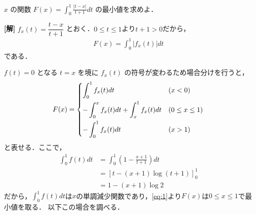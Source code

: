 \documentclass[a4paper,10pt]{ltjsarticle}
\begin{document}
\begin{oframed}
$x$ の関数 $\displaystyle F(x) = \int_0^1 \frac{|t-x|}{t+1} dt$ の最小値を求めよ．
\end{oframed}
\setlength{\columnseprule}{0.4pt}
\begin{multicols}{2}
{\bf[解]}
$f_{x}(t) = \dfrac{t-x}{t+1}$ とおく．$0\le t\le 1$より$t+1>0$だから，
\begin{align}
 F(x) = \int_{0}^{1} \left|f_{x}(t)\right| dt   
\end{align}
である．

$f(t)=0$ となる $t=x$ を境に $f_{x}(t)$ の符号が変わるため場合分けを行うと，
\begin{align}\label{eq:1}
F(x) =
\begin{dcases}
    \int_{0}^{1} f_{x}(t) dt & (x<0) \\
    -\int_{0}^{x} f_{x}(t) dt + \int_{x}^{1} f_{x}(t) dt & (0 \le x \le 1) \\
    -\int_{0}^{1} f_{x}(t) dt & (x>1)
\end{dcases}
\end{align}
と表せる．ここで，
\begin{align*}
\int_{0}^{1} f(t) dt 
&= \int_{0}^{1} \left(1-\frac{x+1}{t+1}\right) dt \\
&= \left[t - (x+1)\log(t+1)\right]_{0}^{1} \\
&= 1 - (x+1)\log 2
\end{align*}
だから，$\displaystyle\int_{0}^{1} f(t) dt$は$x$の単調減少関数であり，\cref{eq:1}より$F(x)$は$0\le x \le 1$で最小値を取る．
以下この場合を調べる．


\end{multicols}
\end{document}
